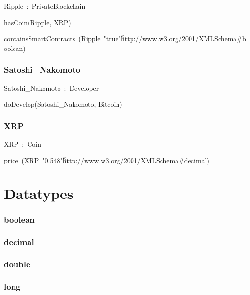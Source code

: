 \documentclass{article}
\begin{document}
Ripple~:~PrivateBlockchain

hasCoin(Ripple, XRP)

containsSmartContracts~(Ripple~"true"\^\^http://www.w3.org/2001/XMLSchema#boolean)

\subsubsection*{Satoshi\_Nakomoto}

Satoshi\_Nakomoto~:~Developer

doDevelop(Satoshi\_Nakomoto, Bitcoin)

\subsubsection*{XRP}

XRP~:~Coin

price~(XRP~"0.548"\^\^http://www.w3.org/2001/XMLSchema#decimal)

\section*{Datatypes}\subsubsection*{boolean}

\subsubsection*{decimal}

\subsubsection*{double}

\subsubsection*{long}
\end{document}
